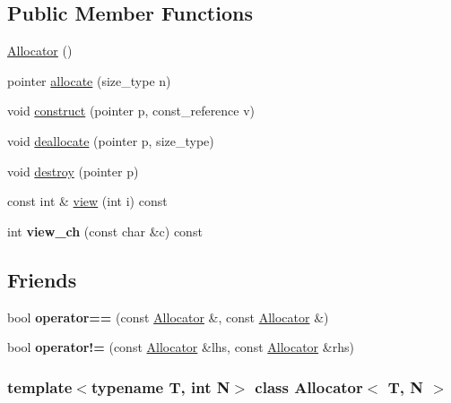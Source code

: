 \subsection*{\-Public \-Member \-Functions}
\begin{DoxyCompactItemize}
\item 
\hyperlink{classAllocator_a4e2bf5fbf94e2206bb72b71ad4b7ffb3}{\-Allocator} ()
\item 
pointer \hyperlink{classAllocator_a8a19b7b675f5434c28c68fb15de86f36}{allocate} (size\-\_\-type n)
\item 
void \hyperlink{classAllocator_a6e6a26ece248be1eb76ed691c085cd65}{construct} (pointer p, const\-\_\-reference v)
\item 
void \hyperlink{classAllocator_a8823b257191f53d7f1efac9332d8f61a}{deallocate} (pointer p, size\-\_\-type)
\item 
void \hyperlink{classAllocator_af156a6a50a8c62c70e40cf342a3b64cb}{destroy} (pointer p)
\item 
const int \& \hyperlink{classAllocator_aad1b14fd9a73456468cf0c8dfb62c211}{view} (int i) const 
\item 
\hypertarget{classAllocator_a2e1c1adee082d4e68be600487f9f4418}{int {\bfseries view\-\_\-ch} (const char \&c) const }\label{classAllocator_a2e1c1adee082d4e68be600487f9f4418}

\end{DoxyCompactItemize}
\subsection*{\-Friends}
\begin{DoxyCompactItemize}
\item 
\hypertarget{classAllocator_ad178871e3d4888c233e0a39e2fe36982}{bool {\bfseries operator==} (const \hyperlink{classAllocator}{\-Allocator} \&, const \hyperlink{classAllocator}{\-Allocator} \&)}\label{classAllocator_ad178871e3d4888c233e0a39e2fe36982}

\item 
\hypertarget{classAllocator_aa59693ec7b26e5ee0a2a4bc71db20040}{bool {\bfseries operator!=} (const \hyperlink{classAllocator}{\-Allocator} \&lhs, const \hyperlink{classAllocator}{\-Allocator} \&rhs)}\label{classAllocator_aa59693ec7b26e5ee0a2a4bc71db20040}

\end{DoxyCompactItemize}
\subsubsection*{template$<$typename T, int \-N$>$ class Allocator$<$ T, N $>$}



